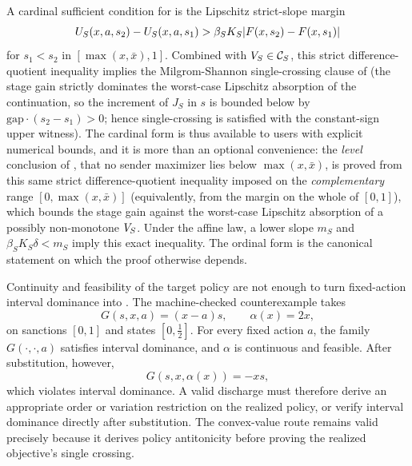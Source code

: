 \begin{remark}
\label{rem:wedge-equivalence}
A cardinal sufficient condition for  is the
Lipschitz strict-slope margin
\[
U_S(x,a,s_2)-U_S(x,a,s_1)
>
\beta_S K_S\lvert F(x,s_2)-F(x,s_1)\rvert
\]
for $s_1<s_2$ in $[\max(x,\bar x),1]$. Combined with
$V_S\in\mathcal C_S$, this
strict difference-quotient inequality implies the Milgrom-Shannon single-crossing
clause of  (the stage gain strictly dominates the
worst-case Lipschitz absorption of the continuation, so the increment
of $J_S$ in $s$ is bounded below by $\mathrm{gap}\cdot(s_2-s_1)>0$;
hence single-crossing is satisfied with the constant-sign upper
witness). The cardinal form is thus available to users with explicit
numerical bounds, and it is more than an optional convenience: the
\emph{level} conclusion of , that no
sender maximizer lies below $\max(x,\bar x)$, is proved from this
same strict difference-quotient inequality imposed on the \emph{complementary}
range $[0,\max(x,\bar x)]$ (equivalently, from the margin on the whole
of $[0,1]$), which bounds the stage gain against the worst-case
Lipschitz absorption of a possibly non-monotone $V_S$. Under the
affine law, a lower slope $m_S$ and
$\beta_S K_S\delta<m_S$ imply this exact inequality. The ordinal
form is the canonical statement on which the proof otherwise depends.
\end{remark}

\begin{remark}
\label{rem:policy-substitution-obstruction}
Continuity and feasibility of the target policy are not enough to turn
fixed-action interval dominance into . The
machine-checked counterexample takes
\[
  G(s,x,a)=(x-a)s,\qquad \alpha(x)=2x,
\]
on sanctions \([0,1]\) and states \([0,\tfrac12]\). For every fixed
action \(a\), the family \(G(\cdot,\cdot,a)\) satisfies interval
dominance, and \(\alpha\) is continuous and feasible. After
substitution, however,
\[
  G(s,x,\alpha(x))=-xs,
\]
which violates interval dominance. A valid discharge must therefore
derive an appropriate order or variation restriction on the realized
policy, or verify interval dominance directly after substitution. The
convex-value route remains valid precisely because it derives policy
antitonicity before proving the realized objective's single crossing.
\end{remark}
